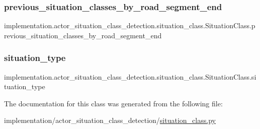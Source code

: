 \subsubsection{\texorpdfstring{previous\+\_\+situation\+\_\+classes\+\_\+by\+\_\+road\+\_\+segment\+\_\+end}{previous\_situation\_classes\_by\_road\_segment\_end}}
{\footnotesize\ttfamily implementation.\+actor\+\_\+situation\+\_\+class\+\_\+detection.\+situation\+\_\+class.\+Situation\+Class.\+previous\+\_\+situation\+\_\+classes\+\_\+by\+\_\+road\+\_\+segment\+\_\+end}

\mbox{\label{classimplementation_1_1actor__situation__class__detection_1_1situation__class_1_1_situation_class_a2782b467e701c72c8a445cfe7284f585}} 
\subsubsection{\texorpdfstring{situation\+\_\+type}{situation\_type}}
{\footnotesize\ttfamily implementation.\+actor\+\_\+situation\+\_\+class\+\_\+detection.\+situation\+\_\+class.\+Situation\+Class.\+situation\+\_\+type}



The documentation for this class was generated from the following file\+:\begin{DoxyCompactItemize}
\item 
implementation/actor\+\_\+situation\+\_\+class\+\_\+detection/\hyperlink{situation__class_8py}{situation\+\_\+class.\+py}\end{DoxyCompactItemize}
